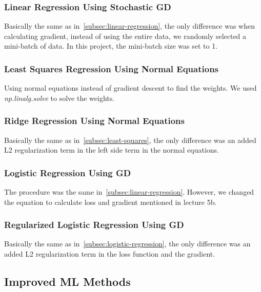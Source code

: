 \documentclass[10pt,conference,compsocconf]{IEEEtran}
\begin{document}
\subsubsection{Linear Regression Using Stochastic GD}\hfill

Basically the same as in~\ref{subsec:linear-regression}, the only difference was when calculating gradient, instead of using the entire data, we randomly selected a mini-batch of data. In this project, the mini-batch size was set to 1.

\subsubsection{Least Squares Regression Using Normal Equations} \hfill
\label{subsec:least-squares}

Using normal equations instead of gradient descent to find the weights. We used \emph{np.linalg.solve} to solve the weights.

\subsubsection{Ridge Regression Using Normal Equations} \hfill

Basically the same as in~\ref{subsec:least-squares}, the only difference was an added L2 regularization term in the left side term in the normal equations.

\subsubsection{Logistic Regression Using GD}\hfill
\label{subsec:logistic-regression}

The procedure was the same in~\ref{subsec:linear-regression}. However, we changed the equation to calculate loss and gradient mentioned in lecture 5b.

\subsubsection{Regularized Logistic Regression Using GD}\hfill

Basically the same as in~\ref{subsec:logistic-regression}, the only difference was an added L2 regularization term in the loss function and the gradient.

\subsection{Improved ML Methods}
\end{document}
